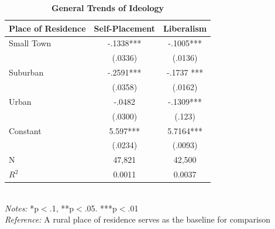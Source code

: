 \documentclass[12pt, titlepage]{article}
\newcommand\e{\emph}
\newcommand\tb{\textbf}
\begin{document}
\begin{appendices}
\begin{table}[H]
	\centering
	\def\arraystretch{1}
	\caption{\tb{General Trends of Ideology}}
	\begin{tabulary}{\linewidth}{l c c}
		\\
		\hline
		\tb{Place of Residence}&\tb{Self-Placement} & \tb{Liberalism} \\
		\hline
		Small Town&-.1338***& -.1005*** \\    
		& (.0336) & (.0136)  \\
		Suburban & -.2591*** &-.1737 ***\\ 
		& (.0358) &(.0162) \\
		Urban   & -.0482 &-.1309***  \\
		& (.0300)  &(.123)  \\
		Constant   & 5.597*** &5.7164*** \\
		&(.0234) & (.0093)\\
		N  & 47,821 & 42,500 \\
		$R^2$	& 0.0011 & 0.0037 \\
		\hline                                       
	\end{tabulary}
	\\
	\e{Notes:} *p$<$.1, **p$<$.05. ***p$<$.01 \\
	\e{Reference:} A rural place of residence serves as the baseline for comparison
	\label{table102}
\end{table}

\clearpage

\end{appendices}


\clearpage


\end{document}
